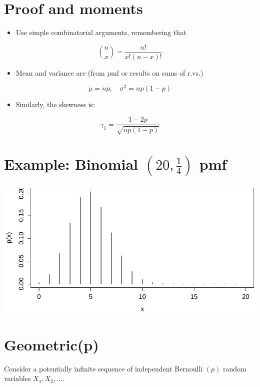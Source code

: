 \documentclass[10pt]{article}
\begin{document}
\section*{Proof and moments}
\begin{itemize}
  \item Use simple combinatorial arguments, remembering that
\end{itemize}

$$
\binom{n}{x}=\frac{n!}{x!(n-x)!}
$$

\begin{itemize}
  \item Mean and variance are (from pmf or results on sums of r.vs.)
\end{itemize}

$$
\mu=n p, \quad \sigma^{2}=n p(1-p)
$$

\begin{itemize}
  \item Similarly, the skewness is:
\end{itemize}

$$
\gamma_{1}=\frac{1-2 p}{\sqrt{n p(1-p)}}
$$

\section*{Example: Binomial $\left(20, \frac{1}{4}\right)$ pmf}
\begin{center}
\includegraphics[max width=\textwidth]{2025_05_11_35704811148ad612caa6g-30}
\end{center}

\section*{Geometric(p)}
Consider a potentially infinite sequence of independent Bernoulli $(p)$ random variables $X_{1}, X_{2}, \ldots$.
\end{document}
